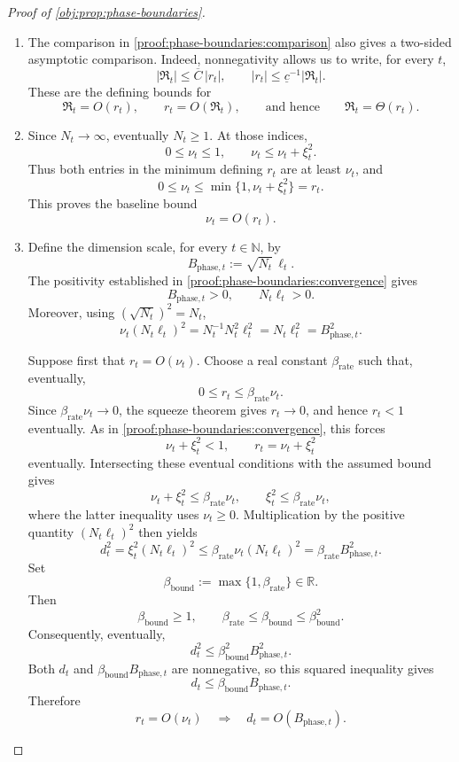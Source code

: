 \documentclass[11pt]{article}
\begin{document}
\begin{proof}[Proof of \cref{obj:prop:phase-boundaries}]
\begin{enumerate}
\item\label{proof:phase-boundaries:theta-comparison} The comparison in \cref{proof:phase-boundaries:comparison} also gives a two-sided asymptotic comparison. Indeed, nonnegativity allows us to write, for every \(t\),
\[
|\mathfrak R_t|
\le\overline C\,|r_t|,
\qquad
|r_t|
\le\underline c^{-1}|\mathfrak R_t|.
\]
These are the defining bounds for
\[
\mathfrak R_t=O(r_t),
\qquad
r_t=O(\mathfrak R_t),
\qquad\text{and hence}\qquad
\mathfrak R_t=\Theta(r_t).
\]

\item\label{proof:phase-boundaries:baseline} Since \(N_t\to\infty\), eventually \(N_t\ge1\). At those indices,
\[
0\le\nu_t\le1,
\qquad
\nu_t\le\nu_t+\xi_t^2.
\]
Thus both entries in the minimum defining \(r_t\) are at least \(\nu_t\), and
\[
0\le\nu_t\le\min\{1,\nu_t+\xi_t^2\}=r_t.
\]
This proves the baseline bound
\[
\nu_t=O(r_t).
\]

\item\label{proof:phase-boundaries:dimension-necessity} Define the dimension scale, for every \(t\in\mathbb N\), by
\[
B_{\mathrm{phase},t}:=\sqrt{N_t}\,\ell_t.
\]
The positivity established in \cref{proof:phase-boundaries:convergence} gives
\[
B_{\mathrm{phase},t}>0,
\qquad
N_t\ell_t>0.
\]
Moreover, using \((\sqrt{N_t})^2=N_t\),
\[
\nu_t(N_t\ell_t)^2
=N_t^{-1}N_t^2\ell_t^2
=N_t\ell_t^2
=B_{\mathrm{phase},t}^2.
\]

Suppose first that \(r_t=O(\nu_t)\). Choose a real constant
\(\beta_{\mathrm{rate}}\) such that, eventually,
\[
0\le r_t\le\beta_{\mathrm{rate}}\nu_t.
\]
Since \(\beta_{\mathrm{rate}}\nu_t\to0\), the squeeze theorem gives \(r_t\to0\), and hence \(r_t<1\) eventually. As in \cref{proof:phase-boundaries:convergence}, this forces
\[
\nu_t+\xi_t^2<1,
\qquad
r_t=\nu_t+\xi_t^2
\]
eventually. Intersecting these eventual conditions with the assumed bound gives
\[
\nu_t+\xi_t^2\le\beta_{\mathrm{rate}}\nu_t,
\qquad
\xi_t^2\le\beta_{\mathrm{rate}}\nu_t,
\]
where the latter inequality uses \(\nu_t\ge0\). Multiplication by the positive quantity \((N_t\ell_t)^2\) then yields
\[
d_t^2
=\xi_t^2(N_t\ell_t)^2
\le\beta_{\mathrm{rate}}\nu_t(N_t\ell_t)^2
=\beta_{\mathrm{rate}}B_{\mathrm{phase},t}^2.
\]
Set
\[
\beta_{\mathrm{bound}}:=\max\{1,\beta_{\mathrm{rate}}\}\in\mathbb R.
\]
Then
\[
\beta_{\mathrm{bound}}\ge1,\qquad
\beta_{\mathrm{rate}}\le\beta_{\mathrm{bound}}
\le\beta_{\mathrm{bound}}^2.
\]
Consequently, eventually,
\[
d_t^2
\le\beta_{\mathrm{bound}}^2B_{\mathrm{phase},t}^2.
\]
Both \(d_t\) and \(\beta_{\mathrm{bound}}B_{\mathrm{phase},t}\) are nonnegative, so this squared inequality gives
\[
d_t\le\beta_{\mathrm{bound}}B_{\mathrm{phase},t}.
\]
Therefore
\[
r_t=O(\nu_t)
\quad\Longrightarrow\quad
d_t=O(B_{\mathrm{phase},t}).
\]


\end{enumerate}
\end{proof}
\end{document}

